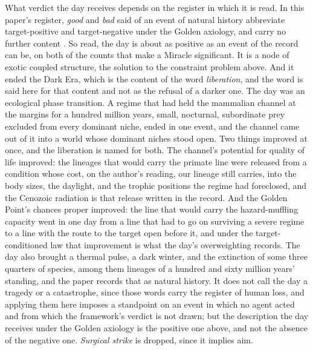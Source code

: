 What verdict the day receives depends on the register in which it is read.
In this paper's register, \emph{good} and \emph{bad} said of an event of
natural history abbreviate target-positive and target-negative under the
Golden axiology, and carry no further content \cite{GoldenReasoning}. So
read, the day is about as positive as an event of the record can be, on both
of the counts that make a Miracle significant. It is a node of exotic coupled
structure, the solution to the constraint problem above. And it ended the
Dark Era, which is the content of the word \emph{liberation}, and the word
is said here for that content and not as the refusal of a darker one. The
day was an ecological phase transition. A regime that had held the mammalian
channel at the margins for a hundred million years, small, nocturnal,
subordinate prey excluded from every dominant niche, ended in one event, and
the channel came out of it into a world whose dominant niches stood open.
Two things improved at once, and the liberation is named for both. The
channel's potential for quality of life improved: the lineages that would
carry the primate line were released from a condition whose cost, on the
author's reading, our lineage still carries, into the body sizes, the
daylight, and the trophic positions the regime had foreclosed, and the
Cenozoic radiation is that release written in the record. And the Golden
Point's chances proper improved: the line that would carry the
hazard-muffling capacity went in one day from a line that had to go on
surviving a severe regime to a line with the route to the target open
before it, and under the target-conditioned law that improvement is what
the day's overweighting records. The day also brought a thermal pulse, a
dark winter, and the extinction of some three quarters of species, among
them lineages of a hundred and sixty million years' standing, and the paper
records that as natural history. It does not call the day a tragedy or a
catastrophe, since those words carry the register of human loss, and
applying them here imposes a standpoint on an event in which no agent acted
and from which the framework's verdict is not drawn; but the description
the day receives under the Golden axiology is the positive one above, and
not the absence of the negative one. \emph{Surgical strike} is dropped,
since it implies aim.
